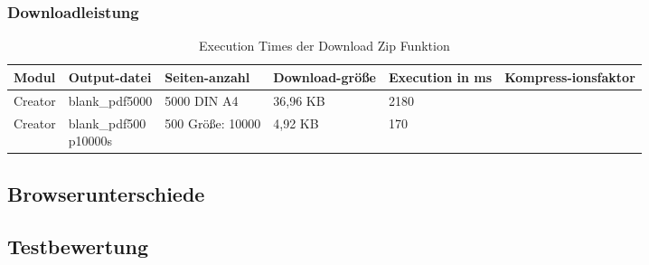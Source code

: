 \subsubsection{Downloadleistung}
\begin{table}[ht]
	\centering
	\begin{tabular}{|p{1.5cm}|p{2.5cm}|p{2cm}|p{2cm}|p{2cm}|p{2cm}|}
		\hline
		\textbf{Modul}		& \textbf{Output-datei}		& \textbf{Seiten-anzahl}		& \textbf{Download-größe} 		& \textbf{Execution in ms} 	& \textbf{Kompress-ionsfaktor}	\\ 
		\hline
		Creator	& blank\_pdf5000 & 5000 DIN A4 & 36,96 KB & 2180 &  \\
		Creator	& \parbox[t]{4cm}{blank\_pdf500\\p10000s} & 500 Größe: 10000 & 4,92 KB & 170 & \\
		\hline
	\end{tabular}
	\caption{Execution Times der Download Zip Funktion}
	\label{table:download-dur}
\end{table}

\subsection{Browserunterschiede}

\subsection{Testbewertung}